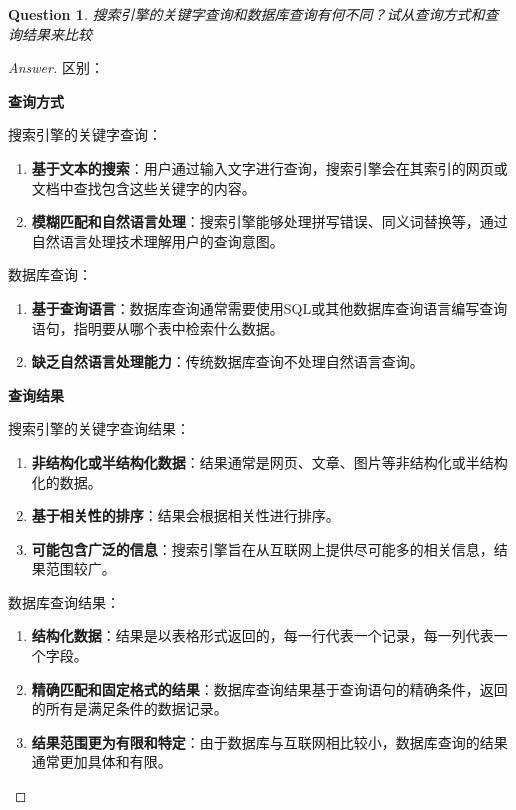 \documentclass[UTF8,a4paper,10pt]{article}
\newtheorem{question}{Question}
\newenvironment{solution}
  {\begin{proof}[Answer]}
  {\end{proof}}
\begin{document}
	\begin{question}
	搜索引擎的关键字查询和数据库查询有何不同？试从查询方式和查询结果来比较 
	\end{question}

	\begin{solution}区别：
	
	\textbf{查询方式}

	搜索引擎的关键字查询：
	\begin{enumerate}
		\item \textbf{基于文本的搜索}：用户通过输入文字进行查询，搜索引擎会在其索引的网页或文档中查找包含这些关键字的内容。
		\item \textbf{模糊匹配和自然语言处理}：搜索引擎能够处理拼写错误、同义词替换等，通过自然语言处理技术理解用户的查询意图。
	\end{enumerate}

	数据库查询：
	\begin{enumerate}
		\item \textbf{基于查询语言}：数据库查询通常需要使用SQL或其他数据库查询语言编写查询语句，指明要从哪个表中检索什么数据。
		\item \textbf{缺乏自然语言处理能力}：传统数据库查询不处理自然语言查询。
	\end{enumerate}
	
	\textbf{查询结果}
	
	搜索引擎的关键字查询结果：
	\begin{enumerate}
		\item \textbf{非结构化或半结构化数据}：结果通常是网页、文章、图片等非结构化或半结构化的数据。
		\item \textbf{基于相关性的排序}：结果会根据相关性进行排序。
		\item \textbf{可能包含广泛的信息}：搜索引擎旨在从互联网上提供尽可能多的相关信息，结果范围较广。
	\end{enumerate}

	数据库查询结果：
	\begin{enumerate}
		\item \textbf{结构化数据}：结果是以表格形式返回的，每一行代表一个记录，每一列代表一个字段。
		\item \textbf{精确匹配和固定格式的结果}：数据库查询结果基于查询语句的精确条件，返回的所有是满足条件的数据记录。
		\item \textbf{结果范围更为有限和特定}：由于数据库与互联网相比较小，数据库查询的结果通常更加具体和有限。
	\end{enumerate}

	\end{solution}
\end{document}
